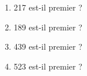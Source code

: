 
\begin{enumerate}
\item 217 est-il premier ?
\item 189 est-il premier ?
\item 439 est-il premier ?
\item 523 est-il premier ?
\end{enumerate}